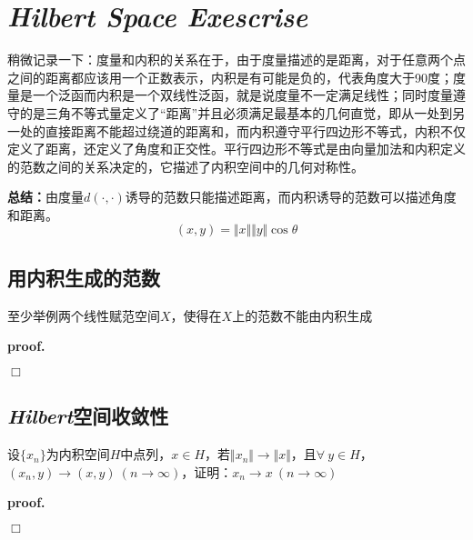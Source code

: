 \chapter{\textsl{Hilbert Space Exescrise}}

稍微记录一下：度量和内积的关系在于，由于度量描述的是距离，对于任意两个点之间的距离都应该用一个正数表示，内积是有可能是负的，代表角度大于90度；度量是一个泛函而内积是一个双线性泛函，就是说度量不一定满足线性；同时度量遵守的是三角不等式量定义了“距离”并且必须满足最基本的几何直觉，即从一处到另一处的直接距离不能超过绕道的距离和，而内积遵守平行四边形不等式，内积不仅定义了距离，还定义了角度和正交性。平行四边形不等式是由向量加法和内积定义的范数之间的关系决定的，它描述了内积空间中的几何对称性。

\textbf{总结：}由度量$d(\cdot,\cdot)$诱导的范数只能描述距离，而内积诱导的范数可以描述角度和距离。
\begin{equation}
    (x,y)=\Vert x\Vert\Vert y\Vert\cos\theta
\end{equation}


\section{用内积生成的范数}

\begin{mdframed}
    \begin{question}
        至少举例两个线性赋范空间$X$，使得在$X$上的范数不能由内积生成
    \end{question}
\end{mdframed}

\textbf{proof.}

$\Box$

\section{\textsl{Hilbert}空间收敛性}

\begin{mdframed}
    \begin{question}
        设$\{x_n\}$为内积空间$H$中点列，$x\in H$，若$\Vert x_n\Vert\rightarrow \Vert x\Vert$，且$\forall\ y\in H$，$(x_n,y)\rightarrow (x,y)\ (n\rightarrow \infty)$，证明：$x_n\rightarrow x\ (n\rightarrow \infty)$
    \end{question}
\end{mdframed}

\textbf{proof.}

$\Box$

